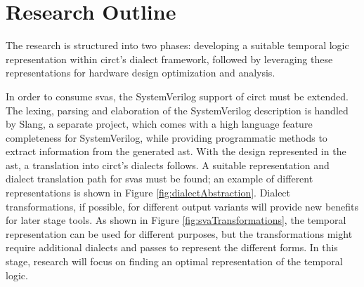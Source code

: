 \documentclass[11pt,DIV=16,parskip=half]{scrartcl}
\begin{document}
\section{Research Outline}



The research is structured into two phases: developing a suitable temporal
logic representation within \gls{circt}'s dialect framework, followed by
leveraging these representations for hardware design optimization and analysis.

In order to consume \glspl{sva}, the SystemVerilog support of \gls{circt} must
be extended.
The lexing, parsing and elaboration of the SystemVerilog description is handled
by Slang, a separate project, which comes with a high language feature
completeness for SystemVerilog, while providing programmatic methods to extract
information from the generated \gls{ast}.
With the design represented in the \gls{ast}, a translation into \gls{circt}'s
dialects follows.
A suitable representation and dialect translation path for \glspl{sva} must be
found; an example of different representations is shown in Figure
\ref{fig:dialectAbstraction}.
Dialect transformations, if possible, for different output variants will
provide new benefits for later stage tools.
As shown in Figure \ref{fig:svaTransformations}, the temporal representation
can be used for different purposes, but the transformations might require
additional dialects and passes to represent the different forms.
In this stage, research will focus on finding an optimal representation of the
temporal logic.
\end{document}
